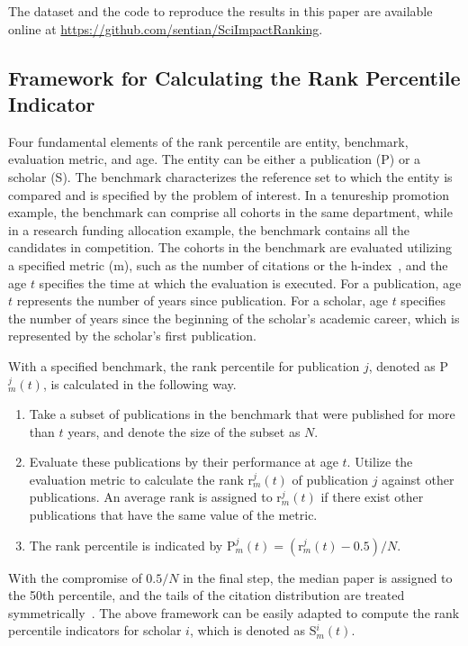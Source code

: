 The dataset and the code to reproduce the results in this paper are available online at \url{https://github.com/sentian/SciImpactRanking}.

\subsection*{Framework for Calculating the Rank Percentile Indicator}

Four fundamental elements of the rank percentile are entity, benchmark, evaluation metric, and age. The entity can be either a publication (P) or a scholar (S). The benchmark characterizes the reference set to which the entity is compared and is specified by the problem of interest. In a tenureship promotion example, the benchmark can comprise all cohorts in the same department, while in a research funding allocation example, the benchmark contains all the candidates in competition. The cohorts in the benchmark are evaluated utilizing a specified metric (m), such as the number of citations or the h-index~\cite{hirsch2005index}, and the age $t$ specifies the time at which the evaluation is executed. For a publication, age $t$ represents the number of years since publication. For a scholar, age $t$ specifies the number of years since the beginning of the scholar's academic career, which is represented by the scholar's first publication. 

With a specified benchmark, the rank percentile for publication $j$, denoted as P$_{m}^{j}(t)$, is calculated in the following way.
\begin{enumerate}
    \item Take a subset of publications in the benchmark that were published for more than $t$ years, and denote the size of the subset as $N$.
    \item Evaluate these publications by their performance at age $t$. Utilize the evaluation metric to calculate the rank r$_{m}^{j}(t)$ of publication $j$ against other publications. An average rank is assigned to r$_{m}^{j}(t)$ if there exist other publications that have the same value of the metric. 
    \item The rank percentile is indicated by $\text{P}_{m}^{j}(t)= \left(\text{r}_{m}^{j}(t)-0.5\right)/N$.
\end{enumerate}
With the compromise of $0.5/N$ in the final step, the median paper is assigned to the 50th percentile, and the tails of the citation distribution are treated symmetrically~\cite{hazen1914storage,bornmann2013use}. The above framework can be easily adapted to compute the rank percentile indicators for scholar $i$, which is denoted as S$_{m}^{i}(t)$.


